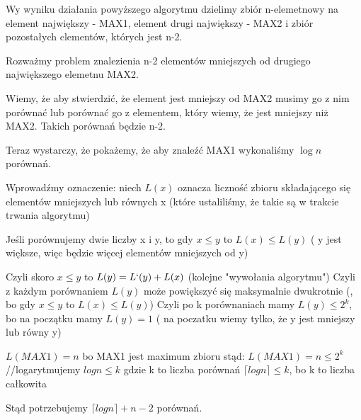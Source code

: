 \documentclass[12pt]{article}
\begin{document}
Wy wyniku działania powyższego algorytmu dzielimy zbiór n-elemetnowy na element największy - MAX1, element drugi największy - MAX2 i zbiór pozostałych clementów, których jest n-2.

Rozważmy problem znalezienia n-2 elementów mniejszych od drugiego największego elemetnu MAX2.

Wiemy, że aby stwierdzić, że element jest mniejszy od MAX2 musimy go z nim porównać lub porównać go z elementem, który wiemy, że jest mniejszy niż MAX2.
Takich porównań będzie n-2.

Teraz wystarczy, że pokażemy, że aby znaleźć MAX1 wykonaliśmy $\log n$ porównań.

Wprowadźmy oznaczenie:
niech $L(x)$ oznacza liczność zbioru składającego się elementów mniejszych lub równych x  (które ustaliliśmy, że takie są w trakcie trwania algorytmu)

Jeśli porównujemy dwie liczby x i y, to gdy $x \leq y$ to $L(x) \leq L(y)$ ( y jest większe, więc będzie więcej elementów mniejszych od y)

Czyli skoro $x\leq y$ to $L(y) = L`(y) + L(x)$ (kolejne "wywołania algorytmu")
Czyli z każdym porównaniem $L(y)$ może powiększyć się maksymalnie dwukrotnie (, bo gdy $x \leq y$ to $L(x) \leq L(y)$)
Czyli po k porównaniach mamy $L(y) \leq 2^k$, bo na początku mamy $L(y) = 1$ ( na poczatku wiemy tylko, że y jest mniejszy lub równy y)

$L(MAX1)= n$ bo MAX1 jest maximum zbioru
stąd:
$L(MAX1)=n \leq 2^k$ //logarytmujemy
$logn \leq k$ gdzie k to liczba porównań
$\lceil logn \rceil \leq k$, bo k to liczba całkowita

Stąd potrzebujemy $\lceil logn \rceil+n-2$ porównań.

\egroup
\end{document}
